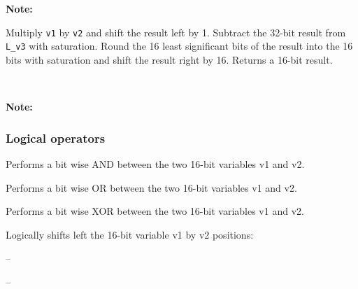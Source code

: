 \textbf{Note:} \hfill {}


Multiply {\tt v1} by {\tt v2} and shift the result left by 1.
Subtract the 32-bit result from {\tt L\_v3} with saturation. Round
the 16 least significant bits of the result into the 16 bits with
saturation and shift the result right by 16. Returns a 16-bit
result.

\ \\

\textbf{Note:} \hfill {}

\subsubsection{Logical operators}

 

Performs a bit wise AND between the two 16-bit variables v1 and
v2.

 

Performs a bit wise OR between the two 16-bit variables v1 and
v2. 

 

Performs a bit wise XOR between the two 16-bit variables v1 and
v2. 

 

Logically shifts left the 16-bit variable v1 by v2 positions:

 -- 

 -- 



